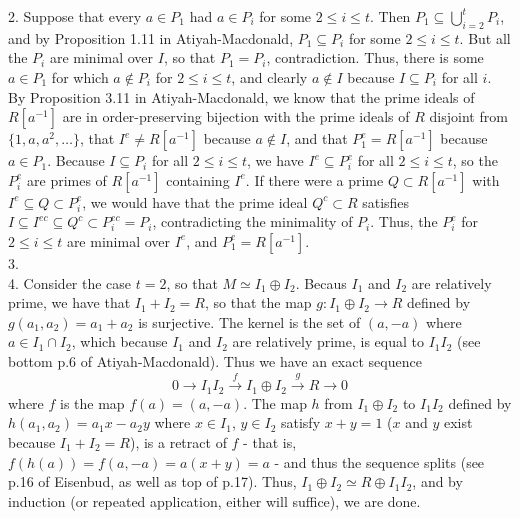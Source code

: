 \documentclass[11pt]{article}
\begin{document}
\num{2.} Suppose that every $a\in P_1$ had $a\in P_i$ for some $2\leq i\leq t$. Then $P_1\subseteq\bigcup_{i=2}^t P_i$, and by Proposition 1.11 in Atiyah-Macdonald, $P_1\subseteq P_i$ for some $2\leq i\leq t$. But all the $P_i$ are minimal over $I$, so that $P_1=P_i$, contradiction. Thus, there is some $a\in P_1$ for which $a\notin P_i$ for $2\leq i\leq t$, and clearly $a\notin I$ because $I\subseteq P_i$ for all $i$. By Proposition 3.11 in Atiyah-Macdonald, we know that the prime ideals of $R[a^{-1}]$ are in order-preserving bijection with the prime ideals of $R$ disjoint from $\{1,a,a^2,\ldots\}$, that $I^e\neq R[a^{-1}]$ because $a\notin I$, and that $P_1^e= R[a^{-1}]$ because $a\in P_1$. Because $I\subseteq P_i$ for all $2\leq i\leq t$, we have $I^e\subseteq P_i^e$ for all $2\leq i\leq t$, so the $P_i^e$ are primes of $R[a^{-1}]$ containing $I^e$. If there were a prime $Q\subset R[a^{-1}]$ with $I^e\subseteq Q\subset P_i^e$, we would have that the prime ideal $Q^c\subset R$ satisfies $I\subseteq I^{ec}\subseteq Q^c\subset P_i^{ec}=P_i$, contradicting the minimality of $P_i$. Thus, the $P_i^e$ for $2\leq i\leq t$ are minimal over $I^e$, and $P_1^e=R[a^{-1}]$.  \\

\num{3.}     \\

\num{4.} Consider the case $t=2$, so that $M\simeq I_1\oplus I_2$. Becaus $I_1$ and $I_2$ are relatively prime, we have that $I_1+I_2=R$, so that the map $g:I_1\oplus I_2\rightarrow R$ defined by $g(a_1,a_2)=a_1+a_2$ is surjective. The kernel is the set of $(a,-a)$ where $a\in I_1\cap I_2$, which because $I_1$ and $I_2$ are relatively prime, is equal to $I_1I_2$ (see bottom p.6 of Atiyah-Macdonald). Thus we have an exact sequence
\[0\rightarrow I_1I_2\stackrel{f}{\rightarrow} I_1\oplus I_2\stackrel{g}{\rightarrow} R\rightarrow 0\]
where $f$ is the map $f(a)=(a,-a)$. The map $h$ from $I_1\oplus I_2$ to $I_1I_2$ defined by $h(a_1,a_2)=a_1x-a_2y$ where $x\in I_1$, $y\in I_2$ satisfy $x+y=1$ ($x$ and $y$ exist because $I_1+I_2=R$), is a retract of $f$ - that is, $f(h(a))=f(a,-a)=a(x+y)=a$ - and thus the sequence splits (see p.16 of Eisenbud, as well as top of p.17). Thus, $I_1\oplus I_2\simeq R\oplus I_1I_2$, and by induction (or repeated application, either will suffice), we are done.\\

\end{document}

